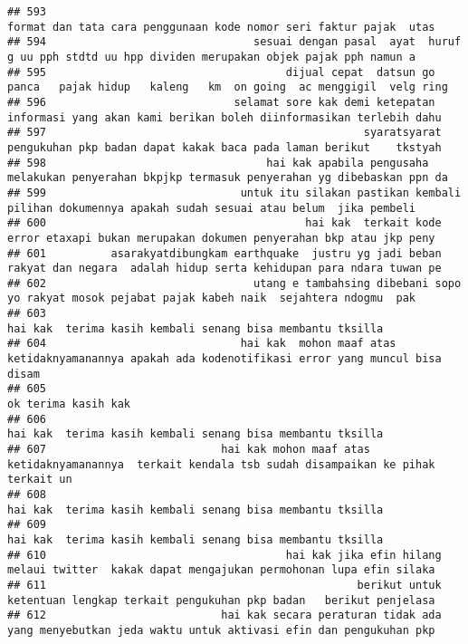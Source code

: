 \documentclass[
]{article}
\begin{document}
\begin{verbatim}
## 593                                                              format dan tata cara penggunaan kode nomor seri faktur pajak  utas 
## 594                                sesuai dengan pasal  ayat  huruf g uu pph stdtd uu hpp dividen merupakan objek pajak pph namun a 
## 595                                     dijual cepat  datsun go panca   pajak hidup   kaleng   km  on going  ac menggigil  velg ring
## 596                             selamat sore kak demi ketepatan informasi yang akan kami berikan boleh diinformasikan terlebih dahu 
## 597                                                 syaratsyarat pengukuhan pkp badan dapat kakak baca pada laman berikut    tkstyah
## 598                                  hai kak apabila pengusaha melakukan penyerahan bkpjkp termasuk penyerahan yg dibebaskan ppn da 
## 599                              untuk itu silakan pastikan kembali pilihan dokumennya apakah sudah sesuai atau belum  jika pembeli 
## 600                                        hai kak  terkait kode error etaxapi bukan merupakan dokumen penyerahan bkp atau jkp peny 
## 601          asarakyatdibungkam earthquake  justru yg jadi beban rakyat dan negara  adalah hidup serta kehidupan para ndara tuwan pe
## 602                                utang e tambahsing dibebani sopo yo rakyat mosok pejabat pajak kabeh naik  sejahtera ndogmu  pak 
## 603                                                                       hai kak  terima kasih kembali senang bisa membantu tksilla
## 604                              hai kak  mohon maaf atas ketidaknyamanannya apakah ada kodenotifikasi error yang muncul bisa disam 
## 605                                                                                                              ok terima kasih kak
## 606                                                                       hai kak  terima kasih kembali senang bisa membantu tksilla
## 607                           hai kak mohon maaf atas ketidaknyamanannya  terkait kendala tsb sudah disampaikan ke pihak terkait un 
## 608                                                                       hai kak  terima kasih kembali senang bisa membantu tksilla
## 609                                                                       hai kak  terima kasih kembali senang bisa membantu tksilla
## 610                                     hai kak jika efin hilang melaui twitter  kakak dapat mengajukan permohonan lupa efin silaka 
## 611                                                berikut untuk ketentuan lengkap terkait pengukuhan pkp badan   berikut penjelasa 
## 612                           hai kak secara peraturan tidak ada yang menyebutkan jeda waktu untuk aktivasi efin dan pengukuhan pkp 

\end{verbatim}
\end{document}

